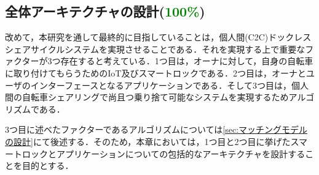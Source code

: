   \subsection{全体アーキテクチャの設計(\textcolor{green}{100\%})}
    \label{sec:全体アーキテクチャの設計}
      \par 改めて，本研究を通して最終的に目指していることは，個人間(C2C)ドックレスシェアサイクルシステムを実現させることである．それを実現する上で重要なファクターが3つ存在すると考えている．1つ目は，オーナに対して，自身の自転車に取り付けてもらうためのIoT及びスマートロックである．2つ目は，オーナとユーザのインターフェースとなるアプリケーションである．そして3つ目は，個人間の自転車シェアリングで尚且つ乗り捨て可能なシステムを実現するためアルゴリズムである．
      \par 3つ目に述べたファクターであるアルゴリズムについては\ref{sec:マッチングモデルの設計}にて後述する．そのため，本章においては，1つ目と2つ目に挙げたスマートロックとアプリケーションについての包括的なアーキテクチャを設計することを目的とする．

